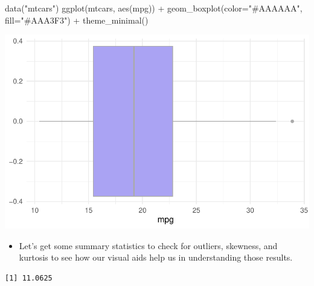 \documentclass[
  letterpaper,
  DIV=11,
  numbers=noendperiod]{scrreprt}
\newenvironment{Shaded}{\begin{snugshade}}{\end{snugshade}}
\newcommand{\AttributeTok}[1]{\textcolor[rgb]{0.40,0.45,0.13}{#1}}
\newcommand{\FloatTok}[1]{\textcolor[rgb]{0.68,0.00,0.00}{#1}}
\newcommand{\FunctionTok}[1]{\textcolor[rgb]{0.28,0.35,0.67}{#1}}
\newcommand{\NormalTok}[1]{\textcolor[rgb]{0.00,0.23,0.31}{#1}}
\newcommand{\OtherTok}[1]{\textcolor[rgb]{0.00,0.23,0.31}{#1}}
\newcommand{\SpecialCharTok}[1]{\textcolor[rgb]{0.37,0.37,0.37}{#1}}
\newcommand{\StringTok}[1]{\textcolor[rgb]{0.13,0.47,0.30}{#1}}
\providecommand{\tightlist}{%
  \setlength{\itemsep}{0pt}\setlength{\parskip}{0pt}}\usepackage{longtable,booktabs,array}
\begin{document}
\begin{Shaded}
\begin{Highlighting}[]
\FunctionTok{data}\NormalTok{(}\StringTok{"mtcars"}\NormalTok{)}
\FunctionTok{ggplot}\NormalTok{(mtcars, }\FunctionTok{aes}\NormalTok{(mpg)) }\SpecialCharTok{+} \FunctionTok{geom\_boxplot}\NormalTok{(}\AttributeTok{color=}\StringTok{"\#AAAAAA"}\NormalTok{, }\AttributeTok{fill=}\StringTok{"\#AAA3F3"}\NormalTok{) }\SpecialCharTok{+} \FunctionTok{theme\_minimal}\NormalTok{()}
\end{Highlighting}
\end{Shaded}

\includegraphics{dataviz_files/figure-pdf/unnamed-chunk-32-1.pdf}

\begin{itemize}
\tightlist
\item
  Let's get some summary statistics to check for outliers, skewness, and
  kurtosis to see how our visual aids help us in understanding those
  results.
\end{itemize}

\begin{Shaded}
\end{Shaded}

\begin{verbatim}
[1] 11.0625
\end{verbatim}
\end{document}
